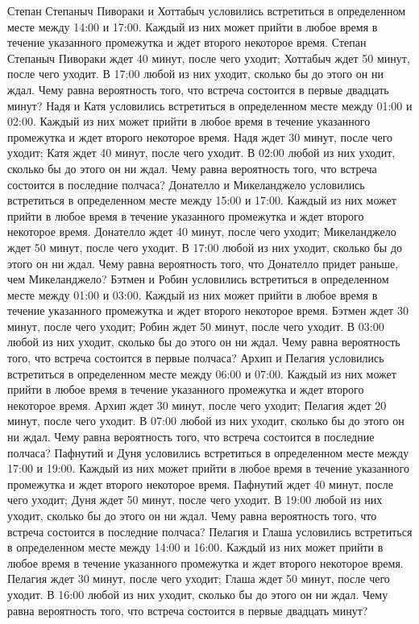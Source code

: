 Степан Степаныч Пивораки и Хоттабыч условились встретиться в определенном месте между 14:00 и 17:00. Каждый из них может прийти в любое время в течение указанного промежутка и ждет второго некоторое время. Степан Степаныч Пивораки ждет 40 минут, после чего уходит; Хоттабыч ждет 50 минут, после чего уходит. В 17:00 любой из них уходит, сколько бы до этого он ни ждал. Чему равна вероятность того, что встреча состоится в первые двадцать минут?
Надя и Катя условились встретиться в определенном месте между 01:00 и 02:00. Каждый из них может прийти в любое время в течение указанного промежутка и ждет второго некоторое время. Надя ждет 30 минут, после чего уходит; Катя ждет 40 минут, после чего уходит. В 02:00 любой из них уходит, сколько бы до этого он ни ждал. Чему равна вероятность того, что встреча состоится в последние полчаса?
Донателло и Микеланджело условились встретиться в определенном месте между 15:00 и 17:00. Каждый из них может прийти в любое время в течение указанного промежутка и ждет второго некоторое время. Донателло ждет 40 минут, после чего уходит; Микеланджело ждет 50 минут, после чего уходит. В 17:00 любой из них уходит, сколько бы до этого он ни ждал. Чему равна вероятность того, что Донателло придет раньше, чем Микеланджело?
Бэтмен и Робин условились встретиться в определенном месте между 01:00 и 03:00. Каждый из них может прийти в любое время в течение указанного промежутка и ждет второго некоторое время. Бэтмен ждет 30 минут, после чего уходит; Робин ждет 50 минут, после чего уходит. В 03:00 любой из них уходит, сколько бы до этого он ни ждал. Чему равна вероятность того, что встреча состоится в первые полчаса?
Архип и Пелагия условились встретиться в определенном месте между 06:00 и 07:00. Каждый из них может прийти в любое время в течение указанного промежутка и ждет второго некоторое время. Архип ждет 30 минут, после чего уходит; Пелагия ждет 20 минут, после чего уходит. В 07:00 любой из них уходит, сколько бы до этого он ни ждал. Чему равна вероятность того, что встреча состоится в последние полчаса?
Пафнутий и Дуня условились встретиться в определенном месте между 17:00 и 19:00. Каждый из них может прийти в любое время в течение указанного промежутка и ждет второго некоторое время. Пафнутий ждет 40 минут, после чего уходит; Дуня ждет 50 минут, после чего уходит. В 19:00 любой из них уходит, сколько бы до этого он ни ждал. Чему равна вероятность того, что встреча состоится в последние полчаса?
Пелагия и Глаша условились встретиться в определенном месте между 14:00 и 16:00. Каждый из них может прийти в любое время в течение указанного промежутка и ждет второго некоторое время. Пелагия ждет 30 минут, после чего уходит; Глаша ждет 50 минут, после чего уходит. В 16:00 любой из них уходит, сколько бы до этого он ни ждал. Чему равна вероятность того, что встреча состоится в первые двадцать минут?
